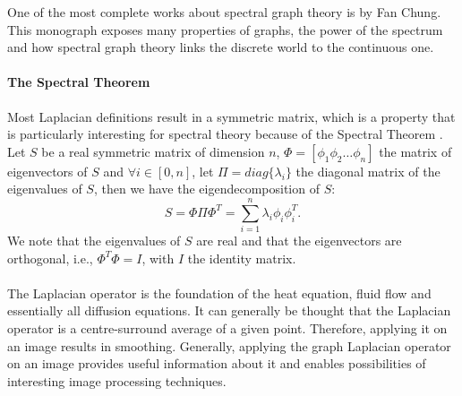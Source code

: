 One of the most complete works about spectral graph theory is \cite{chung_spectral_1997} by Fan Chung.
This monograph exposes many properties of graphs, the power of the spectrum and how spectral graph theory links the discrete world to the continuous one.

\paragraph{The Spectral Theorem}
Most Laplacian definitions result in a symmetric matrix, which is a property that is particularly interesting for spectral theory because of the Spectral Theorem \cite{zhang_spectral_2010}.
Let \(S\) be a real symmetric matrix of dimension \(n\), \(\Phi = [\phi_1 \phi_2 \dots \phi_n ]\) the matrix of eigenvectors of \(S\) and \(\forall i \in [0,n]\), let \(\Pi = diag\{\lambda_i\}\) the diagonal matrix of the eigenvalues of \(S\), then we have the eigendecomposition of \(S\):
\[S = \Phi \Pi \Phi^T = \sum_{i=1}^n \lambda_i \phi_i \phi_i^T.\]
We note that the eigenvalues of \(S\) are real and that the eigenvectors are orthogonal, i.e., \(\Phi^T\Phi = I\), with \(I\) the identity matrix.

%
%
%

\paragraph{}
The Laplacian operator is the foundation of the heat equation, fluid flow and essentially all diffusion equations.
It can generally be thought that the Laplacian operator is a centre-surround average \cite{siam_slides_2016} of a given point.
Therefore, applying it on an image results in smoothing.
Generally, applying the graph Laplacian operator on an image provides useful information about it and enables possibilities of interesting image processing techniques.

